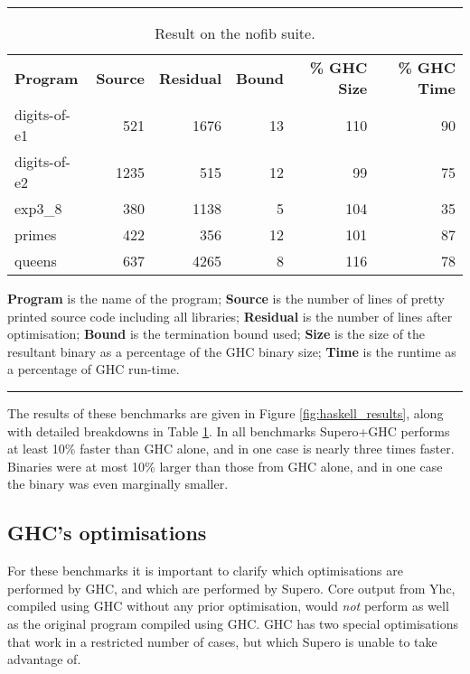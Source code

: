 \documentclass{llncs}
\begin{document}
\begin{table}[tb]
\hrule
\vspace{3mm}

\begin{tabular}{lrrrrr}
\textbf{Program} & \hspace{5mm}\textbf{Source} & \hspace{5mm}\textbf{Residual} & \hspace{5mm}\textbf{Bound} & \hspace{5mm}\textbf{\% GHC Size} & \hspace{5mm}\textbf{\% GHC Time} \\
digits-of-e1 &  521 & 1676 & 13 & 110 & 90 \\
digits-of-e2 & 1235 &  515 & 12 &  99 & 75 \\
exp3\_8      &  380 & 1138 &  5 & 104 & 35 \\
primes       &  422 &  356 & 12 & 101 & 87 \\
queens       &  637 & 4265 &  8 & 116 & 78 \\
\end{tabular}
\vspace{2mm}

\textbf{Program} is the name of the program; \textbf{Source} is the number of lines of pretty printed source code including all libraries; \textbf{Residual} is the number of lines after optimisation; \textbf{Bound} is the termination bound used; \textbf{Size} is the size of the resultant binary as a percentage of the GHC binary size; \textbf{Time} is the runtime as a percentage of GHC run-time.

\vspace{4mm}
\hrule
\vspace{2mm}
\caption{Result on the nofib suite.}
\label{tab:haskell_results}
\end{table}

The results of these benchmarks are given in Figure \ref{fig:haskell_results}, along with detailed breakdowns in Table \ref{tab:haskell_results}. In all benchmarks Supero+GHC performs at least 10\% faster than GHC alone, and in one case is nearly three times faster. Binaries were at most 10\% larger than those from GHC alone, and in one case the binary was even marginally smaller.

\subsection{GHC's optimisations}

For these benchmarks it is important to clarify which optimisations are performed by GHC, and which are performed by Supero. Core output from Yhc, compiled using GHC without any prior optimisation, would \textit{not} perform as well as the original program compiled using GHC. GHC has two special optimisations that work in a restricted number of cases, but which Supero is unable to take advantage of.
\end{document}
